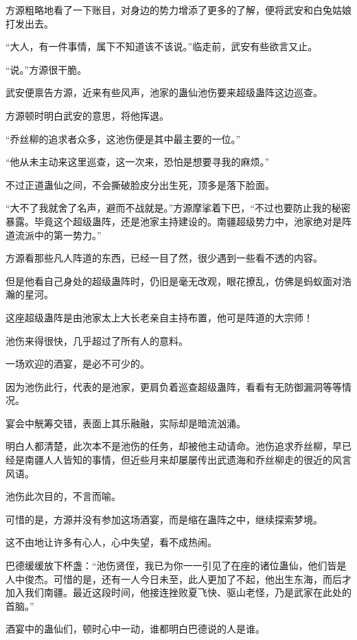 
\begin{this_body}

方源粗略地看了一下账目，对身边的势力增添了更多的了解，便将武安和白兔姑娘打发出去。

“大人，有一件事情，属下不知道该不该说。”临走前，武安有些欲言又止。

“说。”方源很干脆。

武安便禀告方源，近来有些风声，池家的蛊仙池伤要来超级蛊阵这边巡查。

方源顿时明白武安的意思，将他挥退。

“乔丝柳的追求者众多，这池伤便是其中最主要的一位。”

“他从未主动来这里巡查，这一次来，恐怕是想要寻我的麻烦。”

不过正道蛊仙之间，不会撕破脸皮分出生死，顶多是落下脸面。

“大不了我就舍了名声，避而不战就是。”方源摩挲着下巴，“不过也要防止我的秘密暴露。毕竟这个超级蛊阵，还是池家主持建设的。南疆超级势力中，池家绝对是阵道流派中的第一势力。”

方源看那些凡人阵道的东西，已经一目了然，很少遇到一些看不透的内容。

但是他看自己身处的超级蛊阵时，仍旧是毫无改观，眼花撩乱，仿佛是蚂蚁面对浩瀚的星河。

这座超级蛊阵是由池家太上大长老亲自主持布置，他可是阵道的大宗师！

池伤来得很快，几乎超过了所有人的意料。

一场欢迎的酒宴，是必不可少的。

因为池伤此行，代表的是池家，更肩负着巡查超级蛊阵，看看有无防御漏洞等等情况。

宴会中觥筹交错，表面上其乐融融，实际却是暗流汹涌。

明白人都清楚，此次本不是池伤的任务，却被他主动请命。池伤追求乔丝柳，早已经是南疆人人皆知的事情，但近些月来却屡屡传出武遗海和乔丝柳走的很近的风言风语。

池伤此次目的，不言而喻。

可惜的是，方源并没有参加这场酒宴，而是缩在蛊阵之中，继续探索梦境。

这不由地让许多有心人，心中失望，看不成热闹。

巴德缓缓放下杯盏：“池伤贤侄，我已为你一一引见了在座的诸位蛊仙，他们皆是人中俊杰。可惜的是，还有一人今日未至，此人更加了不起，他出生东海，而后才加入我们南疆。最近这段时间，他接连挫败夏飞快、驱山老怪，乃是武家在此处的首脑。”

酒宴中的蛊仙们，顿时心中一动，谁都明白巴德说的人是谁。


\end{this_body}
